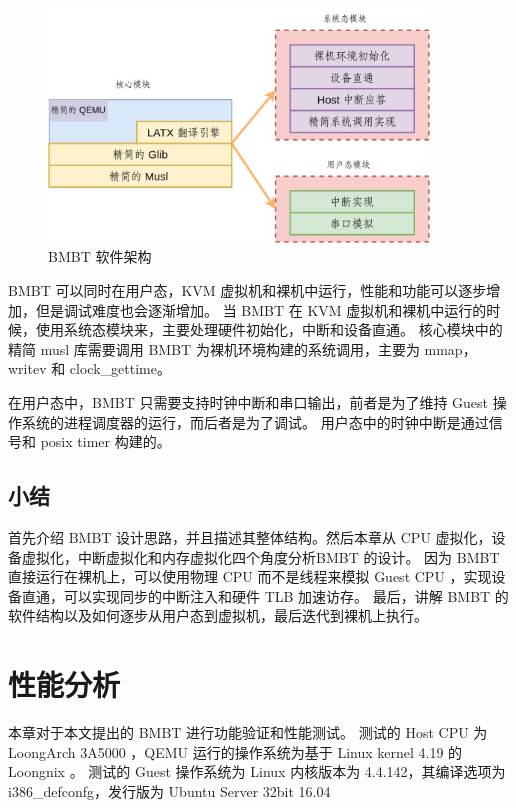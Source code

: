\begin{figure}[!htbp]
	\centering
	\includegraphics[width=0.9\textwidth]{./images/bmbt-software-arch.jpg}
	\caption{BMBT 软件架构}
	\label{fig:bmbt_software_arch}
\end{figure}

BMBT 可以同时在用户态，KVM 虚拟机和裸机中运行，性能和功能可以逐步增加，但是调试难度也会逐渐增加。
当 BMBT 在 KVM 虚拟机和裸机中运行的时候，使用系统态模块来，主要处理硬件初始化，中断和设备直通。
核心模块中的精简 musl 库需要调用 BMBT 为裸机环境构建的系统调用，主要为 mmap，writev 和 clock\_gettime。

在用户态中，BMBT 只需要支持时钟中断和串口输出，前者是为了维持 Guest 操作系统的进程调度器的运行，而后者是为了调试。
用户态中的时钟中断是通过信号和 posix timer 构建的。

\section{小结}
首先介绍 BMBT 设计思路，并且描述其整体结构。然后本章从 CPU 虚拟化，设备虚拟化，中断虚拟化和内存虚拟化四个角度分析BMBT 的设计。
因为 BMBT 直接运行在裸机上，可以使用物理 CPU 而不是线程来模拟 Guest CPU ，实现设备直通，可以实现同步的中断注入和硬件 TLB 加速访存。
最后，讲解 BMBT 的软件结构以及如何逐步从用户态到虚拟机，最后迭代到裸机上执行。

\chapter{性能分析}\label{chap:result}
本章对于本文提出的 BMBT 进行功能验证和性能测试。
测试的 Host CPU 为 LoongArch 3A5000 ，QEMU 运行的操作系统为基于 Linux kernel 4.19 的 Loongnix 。
测试的 Guest 操作系统为 Linux 内核版本为 4.4.142，其编译选项为 i386\_defconfg，发行版为 Ubuntu Server 32bit 16.04

